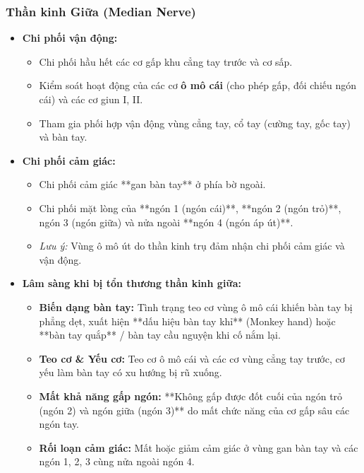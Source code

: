 \subsubsection{Thần kinh Giữa (Median Nerve)}
\begin{itemize}
    \item \textbf{Chi phối vận động:}
    \begin{itemize}
        \item Chi phối hầu hết các cơ gấp khu cẳng tay trước và cơ sấp.
        \item Kiểm soát hoạt động của các cơ \textbf{ô mô cái} (cho phép gấp, đối chiếu ngón cái) và các cơ giun I, II.
        \item Tham gia phối hợp vận động vùng cẳng tay, cổ tay (cường tay, gốc tay) và bàn tay.
    \end{itemize}

    \item \textbf{Chi phối cảm giác:}
    \begin{itemize}
        \item Chi phối cảm giác **gan bàn tay** ở phía bờ ngoài.
        \item Chi phối mặt lòng của **ngón 1 (ngón cái)**, **ngón 2 (ngón trỏ)**, ngón 3 (ngón giữa) và nửa ngoài **ngón 4 (ngón áp út)**.
        \item \textit{Lưu ý:} Vùng ô mô út do thần kinh trụ đảm nhận chi phối cảm giác và vận động.
    \end{itemize}

    \item \textbf{Lâm sàng khi bị tổn thương thần kinh giữa:}
    \begin{itemize}
        \item \textbf{Biến dạng bàn tay:} Tình trạng teo cơ vùng ô mô cái khiến bàn tay bị phẳng dẹt, xuất hiện **dấu hiệu bàn tay khỉ** (Monkey hand) hoặc **bàn tay quắp** / bàn tay cầu nguyện khi cố nắm lại.
        \item \textbf{Teo cơ \& Yếu cơ:} Teo cơ ô mô cái và các cơ vùng cẳng tay trước, cơ yếu làm bàn tay có xu hướng bị rũ xuống.
        \item \textbf{Mất khả năng gấp ngón:} **Không gấp được đốt cuối của ngón trỏ (ngón 2) và ngón giữa (ngón 3)** do mất chức năng của cơ gấp sâu các ngón tay.
        \item \textbf{Rối loạn cảm giác:} Mất hoặc giảm cảm giác ở vùng gan bàn tay và các ngón 1, 2, 3 cùng nửa ngoài ngón 4.
    \end{itemize}
\end{itemize}

